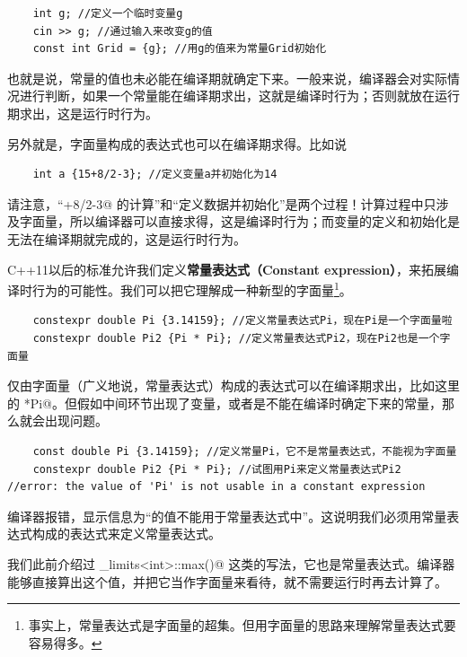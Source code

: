 \begin{lstlisting}
    int g; //定义一个临时变量g
    cin >> g; //通过输入来改变g的值
    const int Grid = {g}; //用g的值来为常量Grid初始化
\end{lstlisting}
也就是说，常量的值也未必能在编译期就确定下来。一般来说，编译器会对实际情况进行判断，如果一个常量能在编译期求出，这就是编译时行为；否则就放在运行期求出，这是运行时行为。\par
另外就是，字面量构成的表达式也可以在编译期求得。比如说
\begin{lstlisting}
    int a {15+8/2-3}; //定义变量a并初始化为14
\end{lstlisting}
请注意，``+8/2-3@ 的计算''和``定义数据并初始化''是两个过程！计算过程中只涉及字面量，所以编译器可以直接求得，这是编译时行为；而变量的定义和初始化是无法在编译期就完成的，这是运行时行为。\par
C++11以后的标准允许我们定义\textbf{常量表达式（Constant expression）}，来拓展编译时行为的可能性。我们可以把它理解成一种新型的字面量\footnote{事实上，常量表达式是字面量的超集。但用字面量的思路来理解常量表达式要容易得多。}。
\begin{lstlisting}
    constexpr double Pi {3.14159}; //定义常量表达式Pi，现在Pi是一个字面量啦
    constexpr double Pi2 {Pi * Pi}; //定义常量表达式Pi2，现在Pi2也是一个字面量
\end{lstlisting}
仅由字面量（广义地说，常量表达式）构成的表达式可以在编译期求出，比如这里的 \lstinline@Pi*Pi@。但假如中间环节出现了变量，或者是不能在编译时确定下来的常量，那么就会出现问题。
\begin{lstlisting}
    const double Pi {3.14159}; //定义常量Pi，它不是常量表达式，不能视为字面量
    constexpr double Pi2 {Pi * Pi}; //试图用Pi来定义常量表达式Pi2
//error: the value of 'Pi' is not usable in a constant expression
\end{lstlisting}
编译器报错，显示信息为``\lstinline@Pi@ 的值不能用于常量表达式中''。这说明我们必须用常量表达式构成的表达式来定义常量表达式。\par
我们此前介绍过 \lstinline@numeric_limits<int>::max()@ 这类的写法，它也是常量表达式。编译器能够直接算出这个值，并把它当作字面量来看待，就不需要运行时再去计算了。\par
